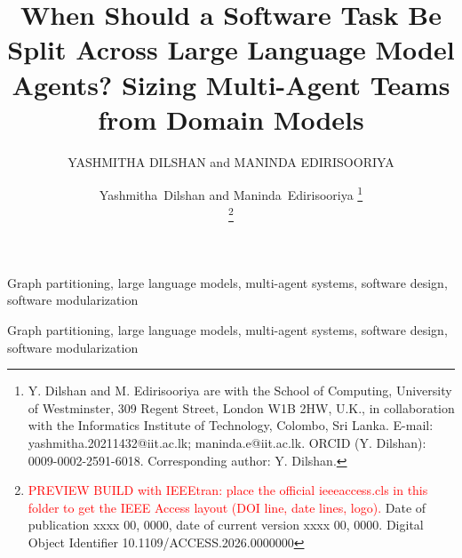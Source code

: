 \IfFileExists{ieeeaccess.cls}{\documentclass{ieeeaccess}\def\OFFICIALIEEEACCESS{1}}{\documentclass[journal]{IEEEtran}}
\newcommand{\history}[1]{}
\newcommand{\doi}[1]{}
\newcommand{\tfootnote}[1]{}
\newcommand{\corresp}[1]{}
\newenvironment{keywords}{\begin{IEEEkeywords}}{\end{IEEEkeywords}}
\begin{document}
\history{Date of publication xxxx 00, 0000, date of current version xxxx 00, 0000.}
\doi{10.1109/ACCESS.2026.0000000}

\title{When Should a Software Task Be Split Across Large Language Model Agents? Sizing Multi-Agent Teams from Domain Models}

\ifdefined\OFFICIALIEEEACCESS
\author{\uppercase{Yashmitha Dilshan} and \uppercase{Maninda Edirisooriya}}
\address[1]{School of Computing, University of Westminster, 309 Regent Street, London W1B 2HW, U.K., in collaboration with the Informatics Institute of Technology, Colombo, Sri Lanka (e-mail: yashmitha.20211432@iit.ac.lk; maninda.e@iit.ac.lk)}
\tfootnote{This work did not receive any specific funding.}
\corresp{Corresponding author: Y. Dilshan (e-mail: yashmitha.20211432@iit.ac.lk; ORCID: 0009-0002-2591-6018).}
\else
\author{Yashmitha~Dilshan and Maninda~Edirisooriya%
\thanks{Y. Dilshan and M. Edirisooriya are with the School of Computing, University of Westminster, 309 Regent Street, London W1B 2HW, U.K., in collaboration with the Informatics Institute of Technology, Colombo, Sri Lanka. E-mail: yashmitha.20211432@iit.ac.lk; maninda.e@iit.ac.lk. ORCID (Y. Dilshan): 0009-0002-2591-6018. Corresponding author: Y. Dilshan.}%

\thanks{\textcolor{red}{PREVIEW BUILD with IEEEtran: place the official ieeeaccess.cls in this folder to get the IEEE Access layout (DOI line, date lines, logo).} Date of publication xxxx 00, 0000, date of current version xxxx 00, 0000. Digital Object Identifier 10.1109/ACCESS.2026.0000000}}
\fi

\newcommand{\AbstractAndKeywords}{%
\begin{abstract}

\end{abstract}
\begin{keywords}
Graph partitioning, large language models, multi-agent systems, software design, software modularization
\end{keywords}}
\ifdefined\OFFICIALIEEEACCESS
  \AbstractAndKeywords
  \titlepgskip=-15pt
  \maketitle
\else
  \maketitle
  \AbstractAndKeywords
\fi
\end{document}
